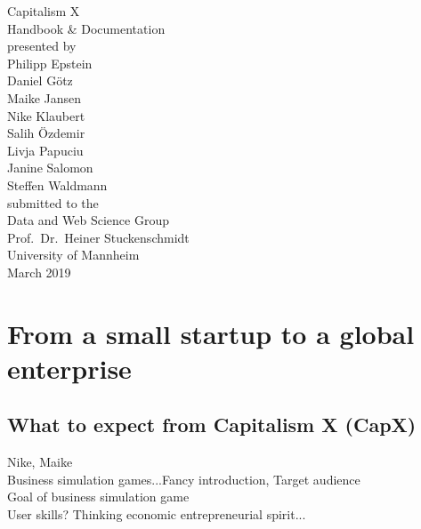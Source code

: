 \documentclass[11pt,titlepage,oneside,openany]{book}
\begin{document}
\begin{titlepage}
	\vspace*{2cm}
  \begin{center}
   {\Large Capitalism X\\}
   \vspace{2cm} 
   {Handbook \& Documentation\\}
   \vspace{2cm}
   {presented by\\
   Philipp Epstein \\
    Daniel G\"otz \\
Maike Jansen \\
Nike Klaubert \\
Salih \"Ozdemir \\
Livja Papuciu \\
Janine Salomon \\
Steffen Waldmann \\
   }
   \vspace{1cm} 
   {submitted to the\\
    Data and Web Science Group\\
    Prof.\ Dr.\ Heiner Stuckenschmidt\\
    University of Mannheim\\} \vspace{2cm}
   {March 2019}
  \end{center}
\end{titlepage} 

\tableofcontents
\newpage

\listoffigures

\listoftables


\newpage

\chapter{From a small startup to a global enterprise}
\label{cha:intro}
\section{What to expect from Capitalism X (CapX)}
Nike, Maike \\
Business simulation games...Fancy introduction, Target audience \\
Goal of business simulation game \\
User skills? Thinking economic entrepreneurial spirit...\\
\end{document}
